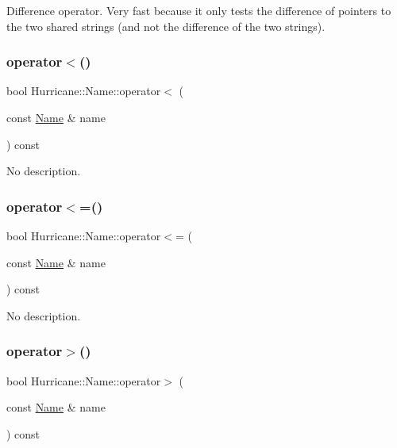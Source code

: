 Difference operator. Very fast because it only tests the difference of pointers to the two shared strings (and not the difference of the two strings). \mbox{\label{classHurricane_1_1Name_a9ce91a54cd340fb1e14baf56797f1577}} 
\subsubsection{\texorpdfstring{operator$<$()}{operator<()}}
{\footnotesize\ttfamily bool Hurricane\+::\+Name\+::operator$<$ (\begin{DoxyParamCaption}\item[{const \hyperlink{classHurricane_1_1Name}{Name} \&}]{name }\end{DoxyParamCaption}) const}

No description. \mbox{\label{classHurricane_1_1Name_a9704f9fe4c605a86de13b6a8d90feab2}} 
\subsubsection{\texorpdfstring{operator$<$=()}{operator<=()}}
{\footnotesize\ttfamily bool Hurricane\+::\+Name\+::operator$<$= (\begin{DoxyParamCaption}\item[{const \hyperlink{classHurricane_1_1Name}{Name} \&}]{name }\end{DoxyParamCaption}) const}

No description. \mbox{\label{classHurricane_1_1Name_a33bd981f4f6923a50c603cd06283032d}} 
\subsubsection{\texorpdfstring{operator$>$()}{operator>()}}
{\footnotesize\ttfamily bool Hurricane\+::\+Name\+::operator$>$ (\begin{DoxyParamCaption}\item[{const \hyperlink{classHurricane_1_1Name}{Name} \&}]{name }\end{DoxyParamCaption}) const}

